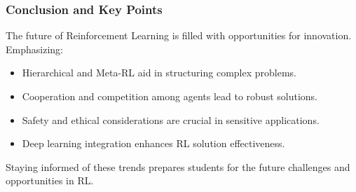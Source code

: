 \documentclass{beamer}
\begin{document}
\begin{frame}[fragile]
    \frametitle{Conclusion and Key Points}
    The future of Reinforcement Learning is filled with opportunities for innovation. Emphasizing:
    \begin{itemize}
        \item Hierarchical and Meta-RL aid in structuring complex problems.
        \item Cooperation and competition among agents lead to robust solutions.
        \item Safety and ethical considerations are crucial in sensitive applications.
        \item Deep learning integration enhances RL solution effectiveness.
    \end{itemize}
    Staying informed of these trends prepares students for the future challenges and opportunities in RL.
\end{frame}
\end{document}
